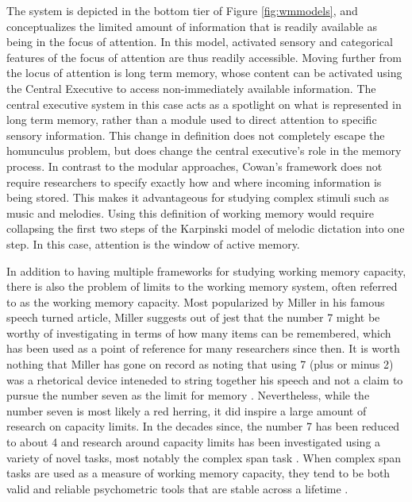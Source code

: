 \documentclass[12pt,]{book}
\begin{document}
The system is depicted in the bottom tier of Figure \ref{fig:wmmodels}, and conceptualizes the limited amount of information that is readily available as being in the focus of attention.
In this model, activated sensory and categorical features of the focus of attention are thus readily accessible.
Moving further from the locus of attention is long term memory, whose content can be activated using the Central Executive to access non-immediately available information.
The central executive system in this case acts as a spotlight on what is represented in long term memory, rather than a module used to direct attention to specific sensory information.
This change in definition does not completely escape the homunculus problem, but does change the central executive's role in the memory process.
In contrast to the modular approaches, Cowan's framework does not require researchers to specify exactly how and where incoming information is being stored.
This makes it advantageous for studying complex stimuli such as music and melodies.
Using this definition of working memory would require collapsing the first two steps of the Karpinski model of melodic dictation into one step.
In this case, attention is the window of active memory.

In addition to having multiple frameworks for studying working memory capacity, there is also the problem of limits to the working memory system, often referred to as the working memory capacity.
Most popularized by Miller in his famous \citep{millerMagicalNumberSeven1956} speech turned article, Miller suggests out of jest that the number 7 might be worthy of investigating in terms of how many items can be remembered, which has been used as a point of reference for many researchers since then.
It is worth nothing that Miller has gone on record as noting that using 7 (plus or minus 2) was a rhetorical device inteneded to string together his speech and not a claim to pursue the number seven as the limit for memory \citep{millerHistoryPsychologyAutobiography1989}.
Nevertheless, while the number seven is most likely a red herring, it did inspire a large amount of research on capacity limits.
In the decades since, the number 7 has been reduced to about 4 \citep{cowanMagicalMysteryFour2010} and research around capacity limits has been investigated using a variety of novel tasks, most notably the complex span task \citep{unsworthAutomatedVersionOperation2005, unsworthComplexWorkingMemory2009}.
When complex span tasks are used as a measure of working memory capacity, they tend to be both valid and reliable psychometric tools that are stable across a lifetime \citep{unsworthAutomatedVersionOperation2005}.
\end{document}

